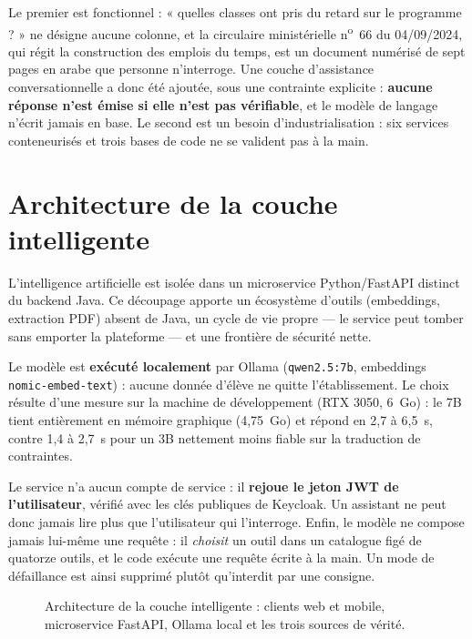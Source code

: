 Le premier est fonctionnel : « quelles classes ont pris du retard sur le
programme ? » ne désigne aucune colonne, et la circulaire ministérielle
n\textsuperscript{o}~66 du 04/09/2024, qui régit la construction des emplois du
temps, est un document numérisé de sept pages en arabe que personne
n'interroge. Une couche d'assistance conversationnelle a donc été ajoutée, sous
une contrainte explicite : \textbf{aucune réponse n'est émise si elle n'est pas
vérifiable}, et le modèle de langage n'écrit jamais en base. Le second est un
besoin d'industrialisation : six services conteneurisés et trois bases de code
ne se valident pas à la main.

\section{Architecture de la couche intelligente}

L'intelligence artificielle est isolée dans un microservice Python/FastAPI
distinct du backend Java. Ce découpage apporte un écosystème d'outils
(embeddings, extraction PDF) absent de Java, un cycle de vie propre — le
service peut tomber sans emporter la plateforme — et une frontière de sécurité
nette.

Le modèle est \textbf{exécuté localement} par Ollama (\texttt{qwen2.5:7b},
embeddings \texttt{nomic-embed-text}) : aucune donnée d'élève ne quitte
l'établissement. Le choix résulte d'une mesure sur la machine de développement
(RTX 3050, 6~Go) : le 7B tient entièrement en mémoire graphique (4,75~Go) et
répond en 2,7 à 6,5~s, contre 1,4 à 2,7~s pour un 3B nettement moins fiable sur
la traduction de contraintes.

Le service n'a aucun compte de service : il \textbf{rejoue le jeton JWT de
l'utilisateur}, vérifié avec les clés publiques de Keycloak. Un assistant ne
peut donc jamais lire plus que l'utilisateur qui l'interroge. Enfin, le modèle
ne compose jamais lui-même une requête : il \emph{choisit} un outil dans un
catalogue figé de quatorze outils, et le code exécute une requête écrite à la
main. Un mode de défaillance est ainsi supprimé plutôt qu'interdit par une
consigne.

\begin{figure}[htbp]
  \centering
  \caption{Architecture de la couche intelligente : clients web et mobile,
  microservice FastAPI, Ollama local et les trois sources de vérité.}
  \label{fig:ch4-architecture}
\end{figure}

